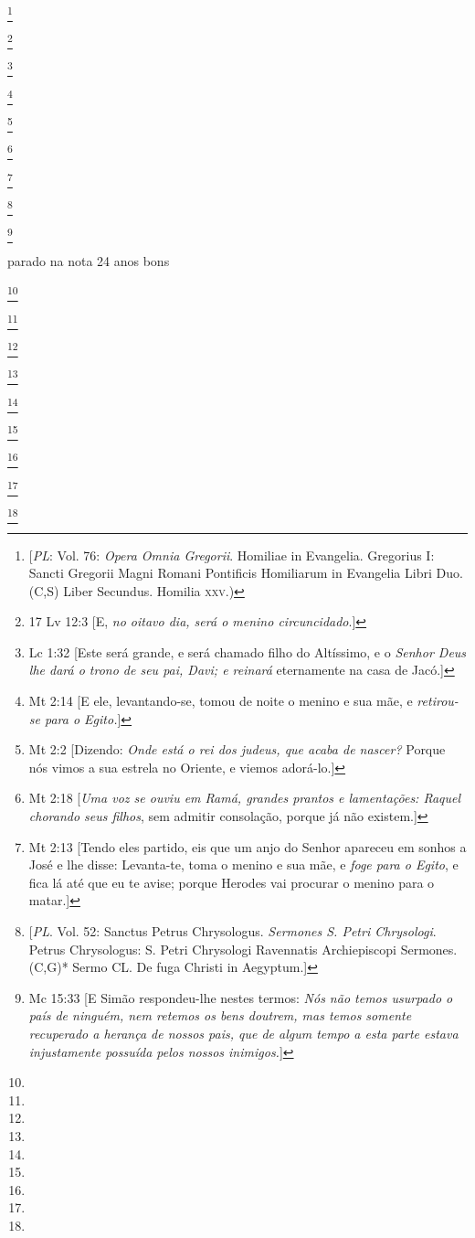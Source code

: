 \footnote{[\textit{PL}: Vol. 76: \textit{Opera Omnia Gregorii}. Homiliae in Evangelia. Gregorius I: Sancti Gregorii Magni Romani Pontificis  Homiliarum in Evangelia Libri Duo. (C,S) Liber Secundus. Homilia \textsc{xxv}.)}

\footnote{17 Lv 12:3 [E, \textit{no oitavo dia, será o menino circuncidado}.]}

\footnote{Lc 1:32 [Este será grande, e será chamado filho do Altíssimo, e o \textit{Senhor Deus lhe dará o trono de seu pai, Davi; e reinará} eternamente na casa de Jacó.]}

\footnote{Mt 2:14 [E ele, levantando-se, tomou de noite o menino e sua mãe, e \textit{retirou-se para o Egito.}]}

\footnote{Mt 2:2 [Dizendo: \textit{Onde está o rei dos judeus, que acaba de nascer?} Porque nós vimos a sua estrela no Oriente, e viemos adorá-lo.]}

\footnote{Mt 2:18 [\textit{Uma voz se ouviu em Ramá, grandes prantos e lamentações: Raquel chorando seus filhos}, sem admitir consolação, porque já não existem.]}

\footnote{Mt 2:13 [Tendo eles partido, eis que um anjo do Senhor apareceu em sonhos a José e lhe disse: Levanta-te, toma o menino e sua mãe, e \textit{foge para o Egito}, e fica lá até que eu te avise; porque Herodes vai procurar o menino para o matar.]}

\footnote{[\textit{PL}. Vol. 52: Sanctus Petrus Chrysologus. \textit{Sermones S. Petri Chrysologi}. Petrus Chrysologus: S. Petri Chrysologi Ravennatis Archiepiscopi Sermones. (C,G)* Sermo CL. De fuga Christi in Aegyptum.]}

\footnote{Mc 15:33 [E Simão respondeu-lhe nestes termos: \textit{Nós não temos usurpado o país de ninguém, nem retemos os bens doutrem, mas temos somente recuperado a herança de nossos pais, que de algum tempo a esta parte estava injustamente possuída pelos nossos inimigos.}]}

parado na nota 24 anos bons\

\footnote{}

\footnote{}

\footnote{}

\footnote{}

\footnote{}

\footnote{}

\footnote{}

\footnote{}

\footnote{}
